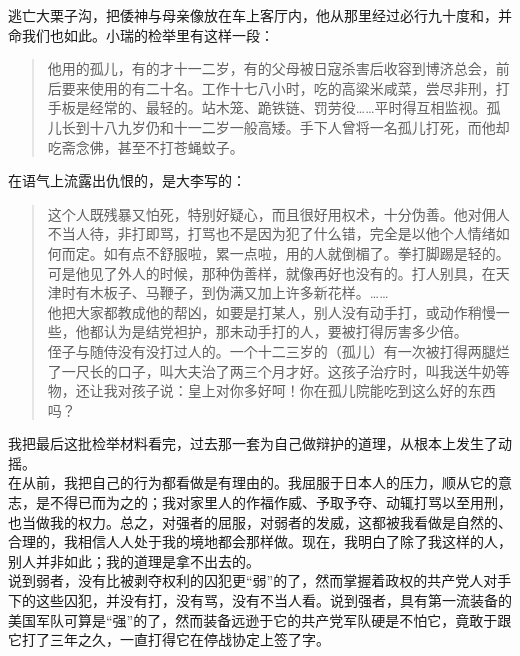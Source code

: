 逃亡大栗子沟，把倭神与母亲像放在车上客厅内，他从那里经过必行九十度和，并命我们也如此。小瑞的检举里有这样一段：\\

\begin{quote}
	他用的孤儿，有的才十一二岁，有的父母被日寇杀害后收容到博济总会，前后要来使用的有二十名。工作十七八小时，吃的高粱米咸菜，尝尽非刑，打手板是经常的、最轻的。站木笼、跪铁链、罚劳役……平时得互相监视。孤儿长到十八九岁仍和十一二岁一般高矮。手下人曾将一名孤儿打死，而他却吃斋念佛，甚至不打苍蝇蚊子。\\
\end{quote}

在语气上流露出仇恨的，是大李写的：\\

\begin{quote}
	这个人既残暴又怕死，特别好疑心，而且很好用权术，十分伪善。他对佣人不当人待，非打即骂，打骂也不是因为犯了什么错，完全是以他个人情绪如何而定。如有点不舒服啦，累一点啦，用的人就倒楣了。拳打脚踢是轻的。可是他见了外人的时候，那种伪善样，就像再好也没有的。打人别具，在天津时有木板子、马鞭子，到伪满又加上许多新花样。……\\

他把大家都教成他的帮凶，如要是打某人，别人没有动手打，或动作稍慢一些，他都认为是结党袒护，那未动手打的人，要被打得厉害多少倍。\\

侄子与随侍没有没打过人的。一个十二三岁的（孤儿）有一次被打得两腿烂了一尺长的口子，叫大夫治了两三个月才好。这孩子治疗时，叫我送牛奶等物，还让我对孩子说：皇上对你多好呵！你在孤儿院能吃到这么好的东西吗？\\
\end{quote}

我把最后这批检举材料看完，过去那一套为自己做辩护的道理，从根本上发生了动摇。\\

在从前，我把自己的行为都看做是有理由的。我屈服于日本人的压力，顺从它的意志，是不得已而为之的；我对家里人的作福作威、予取予夺、动辄打骂以至用刑，也当做我的权力。总之，对强者的屈服，对弱者的发威，这都被我看做是自然的、合理的，我相信人人处于我的境地都会那样做。现在，我明白了除了我这样的人，别人并非如此；我的道理是拿不出去的。\\

说到弱者，没有比被剥夺权利的囚犯更“弱”的了，然而掌握着政权的共产党人对手下的这些囚犯，并没有打，没有骂，没有不当人看。说到强者，具有第一流装备的美国军队可算是“强”的了，然而装备远逊于它的共产党军队硬是不怕它，竟敢于跟它打了三年之久，一直打得它在停战协定上签了字。\\

